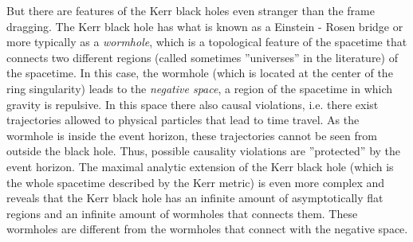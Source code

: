 But there are features of the Kerr black holes even stranger than the frame dragging. The Kerr black hole has what is known as a Einstein - Rosen bridge or more typically as a \textit{wormhole}, which is a topological feature of the spacetime that connects two different regions (called sometimes ''universes'' in the literature) of the spacetime. In this case, the wormhole (which is located at the center of the ring singularity) leads to the \textit{negative space}, a region of the spacetime in which gravity is repulsive. In this space there also causal violations, i.e. there exist trajectories allowed to physical particles that lead to time travel. As the wormhole is inside the event horizon, these trajectories cannot be seen from outside the black hole. Thus, possible causality violations are ''protected'' by the event horizon. The maximal analytic extension of the Kerr black hole (which is the whole spacetime described by the Kerr metric) is even more complex and reveals that the Kerr black hole has an infinite amount of asymptotically flat regions and an infinite amount of wormholes that connects them. These wormholes are different from the wormholes that connect with the negative space.

